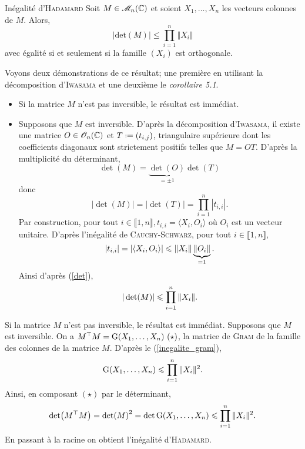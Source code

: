 
\begin{theo}{Inégalité d'\textsc{Hadamard}}
    Soit $M \in \mathscr{M}_n(\mathbb{C})$ et soient $X_1, \dots, X_n$ les vecteurs colonnes de $M$. Alors,
    $$|\mathrm{det}(M)| \leqslant \prod_{i=1}^{n} \Vert X_i \Vert$$
    avec égalité si et seulement si la famille $(X_i)$ est orthogonale.
\end{theo}

%    

Voyons deux démonstrations de ce résultat; une première en utilisant la décomposition d'\textsc{Iwasama} et une deuxième le \emph{corollaire 5.1}.

\begin{preuve}
    \begin{itemize}
        \item Si la matrice $M$ n'est pas inversible, le résultat est immédiat. 
        \item Supposons que $M$ est inversible. D'après la décomposition d'\textsc{Iwasama}, il existe une matrice $O \in \mathscr{O}_n(\mathbb{C})$ et $T \defeq (t_{i,j})$, triangulaire supérieure dont les coefficients diagonaux sont strictement positifs telles que $M = OT$. D'après la multiplicité du déterminant, 
        $$\det(M) = \underbrace{\det(O)}_{= \pm 1} \det(T)$$
        donc
        \begin{equation} \label{det}
            |\det(M)| = |\det(T)| = \prod_{i=1}^{n} |t_{i,i}|.
        \end{equation}
        Par construction, pour tout $i \in \llbracket 1, n \rrbracket, t_{i,i} = \langle X_i, O_i \rangle$ où $O_i$ est un vecteur unitaire. D'après l'inégalité de \textsc{Cauchy}-\textsc{Schwarz}, pour tout $i \in \llbracket 1, n \rrbracket$, 
        $$|t_{i,i}| = |\langle X_i, O_i \rangle | \leqslant \Vert X_i \Vert \underbrace{\Vert O_i \Vert}_{=1}.$$
        Ainsi d'après (\ref{det}), 
        $$|\det(M)| \leqslant \prod_{i=1}^n \Vert X_i \Vert.$$
    \end{itemize}
\end{preuve}

\begin{preuve}
    Si la matrice $M$ n'est pas inversible, le résultat est immédiat. Supposons que $M$ est inversible. On a $M^\top M = \mathrm{G}(X_1, \dots, X_n)\ (\star)$, la matrice de \textsc{Gram} de la famille des colonnes de la matrice $M$. D'après le (\ref{inegalite_gram}), 
    $$\mathrm{G}(X_1, \dots, X_n) \leqslant \prod_{i=1}^n \Vert X_i \Vert^2.$$
    Ainsi, en composant $(\star)$ par le déterminant, 
    $$\det(M^\top M) = \det(M)^2 = \det \mathrm{G}(X_1, \dots, X_n) \leqslant \prod_{i=1}^n \Vert X_i \Vert^2.$$
    En passant à la racine on obtient l'inégalité d'\textsc{Hadamard}.
\end{preuve}

